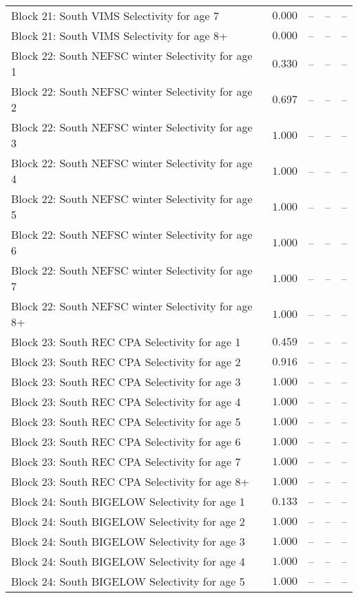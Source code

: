 \documentclass[
]{article}
\begin{document}
\begin{landscape}
\begin{longtable}[t]{lrrrr}
Block 21: South VIMS Selectivity for age 7 & $0.000$ & -- & -- & --\\
Block 21: South VIMS Selectivity for age 8+ & $0.000$ & -- & -- & --\\
\addlinespace
Block 22: South NEFSC winter Selectivity for age 1 & $0.330$ & -- & -- & --\\
Block 22: South NEFSC winter Selectivity for age 2 & $0.697$ & -- & -- & --\\
Block 22: South NEFSC winter Selectivity for age 3 & $1.000$ & -- & -- & --\\
Block 22: South NEFSC winter Selectivity for age 4 & $1.000$ & -- & -- & --\\
Block 22: South NEFSC winter Selectivity for age 5 & $1.000$ & -- & -- & --\\
\addlinespace
Block 22: South NEFSC winter Selectivity for age 6 & $1.000$ & -- & -- & --\\
Block 22: South NEFSC winter Selectivity for age 7 & $1.000$ & -- & -- & --\\
Block 22: South NEFSC winter Selectivity for age 8+ & $1.000$ & -- & -- & --\\
Block 23: South REC CPA Selectivity for age 1 & $0.459$ & -- & -- & --\\
Block 23: South REC CPA Selectivity for age 2 & $0.916$ & -- & -- & --\\
\addlinespace
Block 23: South REC CPA Selectivity for age 3 & $1.000$ & -- & -- & --\\
Block 23: South REC CPA Selectivity for age 4 & $1.000$ & -- & -- & --\\
Block 23: South REC CPA Selectivity for age 5 & $1.000$ & -- & -- & --\\
Block 23: South REC CPA Selectivity for age 6 & $1.000$ & -- & -- & --\\
Block 23: South REC CPA Selectivity for age 7 & $1.000$ & -- & -- & --\\
\addlinespace
Block 23: South REC CPA Selectivity for age 8+ & $1.000$ & -- & -- & --\\
Block 24: South BIGELOW Selectivity for age 1 & $0.133$ & -- & -- & --\\
Block 24: South BIGELOW Selectivity for age 2 & $1.000$ & -- & -- & --\\
Block 24: South BIGELOW Selectivity for age 3 & $1.000$ & -- & -- & --\\
Block 24: South BIGELOW Selectivity for age 4 & $1.000$ & -- & -- & --\\
\addlinespace
Block 24: South BIGELOW Selectivity for age 5 & $1.000$ & -- & -- & --\\

\end{longtable}
\end{landscape}
\end{document}
